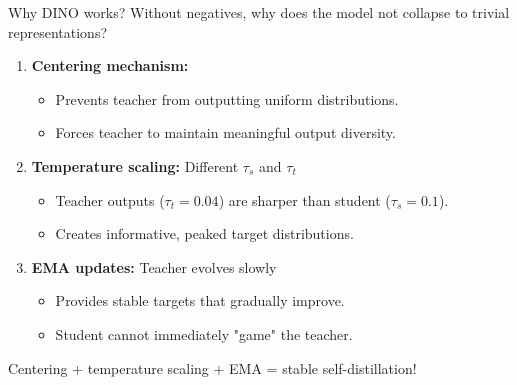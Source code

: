 \documentclass{beamer}
\begin{document}
\begin{frame}{Why DINO works?}
Without negatives, why does the model not collapse to trivial representations?
   \vspace{0.2cm}
\begin{enumerate}
\item \textbf{Centering mechanism:}
  \vspace{0.2cm}
  \begin{itemize}
  \item Prevents teacher from outputting uniform distributions.
  \item Forces teacher to maintain meaningful output diversity.
  \end{itemize}
  \vspace{0.2cm}   
\item \textbf{Temperature scaling:} Different $\tau_s$ and $\tau_t$
  \vspace{0.2cm}
  \begin{itemize}
  \item Teacher outputs ($\tau_t = 0.04$) are sharper than student ($\tau_s = 0.1$).
  \item Creates informative, peaked target distributions.
  \end{itemize}
  \vspace{0.2cm}
\item \textbf{EMA updates:} Teacher evolves slowly
  \vspace{0.3cm}
  \begin{itemize}
  \item Provides stable targets that gradually improve.
  \item Student cannot immediately "game" the teacher.
  \end{itemize}
\end{enumerate}
\vspace{0.2cm}
\alert{Centering + temperature scaling + EMA = stable self-distillation!}
\end{frame}
\end{document}
